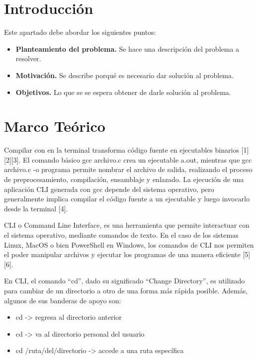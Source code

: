 \documentclass[letterpaper,12pt,oneside]{article}
\begin{document}
\tableofcontents
\clearpage
    
\section{Introducción}

Este apartado debe abordar los siguientes puntos:

\begin{itemize}
    \item \textbf{Planteamiento del problema.} Se hace una descripción del problema a resolver.
    \item \textbf{Motivación.} Se describe porqué es necesario dar solución al problema.
    \item \textbf{Objetivos.} Lo que se se espera obtener de darle solución al problema.
\end{itemize}

\section{Marco Teórico}

Compilar con en la terminal transforma código fuente en ejecutables binarios [1][2][3]. El comando básico gcc archivo.c crea un ejecutable a.out, mientras que gcc archivo.c -o programa permite nombrar el archivo de salida, realizando el proceso de preprocesamiento, compilación, ensamblaje y enlazado.  
La ejecución de una aplicación CLI generada con gcc depende del sistema operativo, pero generalmente implica compilar el código fuente a un ejecutable y luego invocarlo desde la terminal [4].

CLI o Command Line Interface, es una herramienta que permite interactuar con el sistema operativo, mediante comandos de texto. En el caso de los sistemas Linux, MacOS o bien PowerShell en Windows, los comandos de CLI nos permiten el poder manipular archivos y ejecutar los programas de una manera eficiente [5][6].

En CLI, el comando “cd”, dado su significado “Change Directory”, es utilizado para cambiar de un directorio a otro de una forma más rápida posible. Además, algunos de sus banderas de apoyo son:

\begin{itemize}
    \item cd -> regresa al directorio anterior
    \item cd -> va al directorio personal del usuario
    \item cd /ruta/del/directorio -> accede a una ruta específica
\end{itemize}
\end{document}

